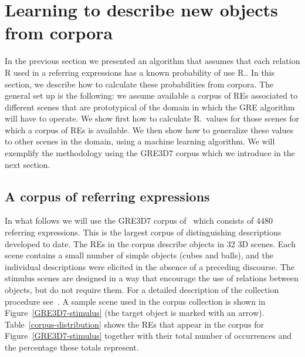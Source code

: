 \section{Learning to describe new objects from corpora}\label{sec:learning}

In the previous section we presented an algorithm that assumes that each relation R used in a referring expressions has a known probability of use R.\puse. In this section, we describe how to calculate these probabilities from corpora.  The general set up is the following: we assume available a corpus of REs associated to different scenes that are prototypical of the domain in which the GRE algorithm will have to operate.   We show first how to calculate R.\puse\ values for those scenes for which a corpus of REs is available.  We then show how to generalize these values to 
other scenes in the domain, using a machine learning algorithm.   We will exemplify the methodology using the GRE3D7 corpus which we introduce in the next section. 

\subsection{A corpus of referring expressions}

In what follows we will use the GRE3D7 corpus of~ which consists of 4480 referring expressions. This is the largest corpus of distinguishing descriptions developed to date. The REs in the corpus describe objects in 32 3D scenes. Each scene contains a small number of simple objects (cubes and balls), and the individual descriptions were elicited in the absence of a preceding discourse. The stimulus scenes are designed in a way that encourage the use of relations between objects, but do not require them. For a detailed description of the collection procedure see~\cite[Chapter 5]{viet:gene11}. A sample scene used in the corpus collection is shown in Figure~\ref{GRE3D7-stimulus} (the target object is marked with an arrow). Table~\ref{corpus-distribution} shows the REs that appear in the corpus for Figure~\ref{GRE3D7-stimulus} together with their total number of occurrences and the percentage these totals represent.  

